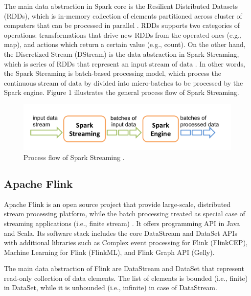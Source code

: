 \documentclass[]{article}
\begin{document}
\par The main data abstraction in Spark core is the Resilient Distributed Datasets (RDDs), which is in-memory collection of elements partitioned across cluster of computers that can be processed in parallel \cite{rdd}. RDDs supports two categories of operations: transformations that drive new RDDs from the operated ones (e.g., map), and actions which return a certain value (e.g., count). On the other hand, the Discretized Stream (DStream) is the data abstraction in Spark Streaming, which is series of RDDs that represent an input stream of data \cite{spark_streaming}. In other words, the Spark Streaming is batch-based processing model, which process the continuous stream of data by divided into micro-batches to be processed by the Spark engine. Figure 1 illustrates the general process flow of Spark Streaming. 


\begin{figure}[h]
 
  \centering
    \includegraphics[width=.9\textwidth, height=.2\textheight]{streaming-flow.png}
     \caption{ Process flow of Spark Streaming \cite{spark_streaming}.}
\end{figure} 

\subsection{Apache Flink}

\par Apache Flink is an open source project that provide large-scale, distributed stream processing platform, while the batch processing treated as special case of streaming applications (i.e., finite stream)  \cite{flink}.
It offers programming API in Java and Scala. Its software stack includes the core DataStream and DataSet APIs with additional libraries such as Complex event processing for Flink (FlinkCEP), Machine Learning for Flink (FlinkML), and Flink Graph API (Gelly).

\par The main data abstraction of Flink are DataStream and DataSet that represent read-only collection of data elements. The list of elements is bounded (i.e., finite) in DataSet, while it is unbounded (i.e., infinite) in case of DataStream.
\end{document}
